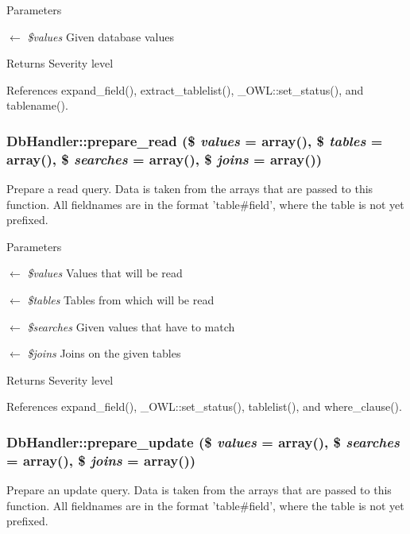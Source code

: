 \begin{DoxyParams}{Parameters}
\item[\mbox{$\leftarrow$} {\em \$values}]Given database values \end{DoxyParams}
\begin{DoxyReturn}{Returns}
Severity level 
\end{DoxyReturn}


References expand\_\-field(), extract\_\-tablelist(), \_\-OWL::set\_\-status(), and tablename().

\subsubsection[{prepare\_\-read}]{\setlength{\rightskip}{0pt plus 5cm}DbHandler::prepare\_\-read (\$ {\em values} = {\ttfamily array()}, \/  \$ {\em tables} = {\ttfamily array()}, \/  \$ {\em searches} = {\ttfamily array()}, \/  \$ {\em joins} = {\ttfamily array()})}\label{classDbHandler_a3f9a0832d2de73e1f698b6d3c33569e6}
Prepare a read query. Data is taken from the arrays that are passed to this function. All fieldnames are in the format 'table\#field', where the table is not yet prefixed.


\begin{DoxyParams}{Parameters}
\item[\mbox{$\leftarrow$} {\em \$values}]Values that will be read \item[\mbox{$\leftarrow$} {\em \$tables}]Tables from which will be read \item[\mbox{$\leftarrow$} {\em \$searches}]Given values that have to match \item[\mbox{$\leftarrow$} {\em \$joins}]Joins on the given tables \end{DoxyParams}
\begin{DoxyReturn}{Returns}
Severity level 
\end{DoxyReturn}


References expand\_\-field(), \_\-OWL::set\_\-status(), tablelist(), and where\_\-clause().

\subsubsection[{prepare\_\-update}]{\setlength{\rightskip}{0pt plus 5cm}DbHandler::prepare\_\-update (\$ {\em values} = {\ttfamily array()}, \/  \$ {\em searches} = {\ttfamily array()}, \/  \$ {\em joins} = {\ttfamily array()})}\label{classDbHandler_a9bddaca38be2544f6fdd4d82b3cd1c50}
Prepare an update query. Data is taken from the arrays that are passed to this function. All fieldnames are in the format 'table\#field', where the table is not yet prefixed.


